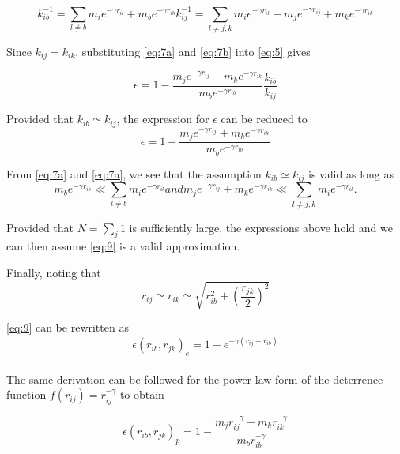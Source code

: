 \documentclass{article}
\begin{document}
\begin{subequations}
\begin{equation}\label{eq:7a}
k_{ib}^{-1} = \sum_{l \neq b}{m_i e^{-\gamma r_{il}}} + m_b e^{-\gamma r_{ib}}
\end{equation}
\begin{equation}\label{eq:7b}
k_{ij}^{-1} = \sum_{l \neq j, k}{m_i e^{-\gamma r_{il}}} + m_j e^{-\gamma r_{ij}} + m_k e^{-\gamma r_{ik}}
\end{equation}
\end{subequations}

Since $k_{ij} = k_{ik}$, substituting \eqref{eq:7a} and \eqref{eq:7b} into \eqref{eq:5} gives

\begin{equation}\label{eq:8}
\epsilon = 1 - \frac{ m_j e^{-\gamma r_{ij}} + m_k e^{-\gamma r_{ik}}}{m_b e^{-\gamma r_{ib}}} 
\frac{k_{ib}}{k_{ij}}
\end{equation}

Provided that $k_{ib} \simeq k_{ij}$, the expression for $\epsilon$ can be reduced to
\begin{equation}\label{eq:9}
\epsilon = 1 - \frac{m_j e^{-\gamma r_{ij}} + m_k e^{-\gamma r_{ik}}}{m_b e^{- \gamma r_{ib}}}
\end{equation}

From \eqref{eq:7a} and \eqref{eq:7a}, we see that the assumption  $k_{ib} \simeq k_{ij}$ is valid as long as 
\begin{subequations}
\begin{equation}\label{eq:10a}
m_b e^{- \gamma r_{ib}} \ll \sum_{l \neq b}{m_i e^{-\gamma r_{il}}}
\end{equation}
and 
\begin{equation}\label{eq:10b} 
{m_j e^{-\gamma r_{ij}} + m_k e^{-\gamma r_{ik}}} \ll \sum_{l \neq j, k}{m_i e^{-\gamma r_{il}}}.
\end{equation}
\end{subequations}

Provided that $N = \sum_{j}{1}$ is sufficiently large, the expressions above hold and we can then assume \eqref{eq:9} is a valid approximation.
\\
\par Finally, noting that
\begin{equation}\label{eq:11}
r_{ij} \simeq r_{ik} \simeq \sqrt{r_{ib}^2 + \left(\frac{r_{jk}}{2}\right)^2}
\end{equation}

\eqref{eq:9} can be rewritten as
\begin{equation}\label{eq:12}
\epsilon \left( r_{ib}, r_{jk} \right)_{e} = 1 - e^{-\gamma \left( r_{ij} - r_{ib}\right)} 
\end{equation}
\\
The same derivation can be followed for the power law form of the deterrence function $f(r_{ij}) = r_{ij}^{-\gamma}$ to obtain 

\begin{equation}\label{eq:13}
\epsilon(r_{ib}, r_{jk})_{p} = 1 - \frac{m_j r_{ij}^{-\gamma} + m_k r_{ik}^{-\gamma}}{m_b r_{ib}^{-\gamma}}
\end{equation}
\end{document}
